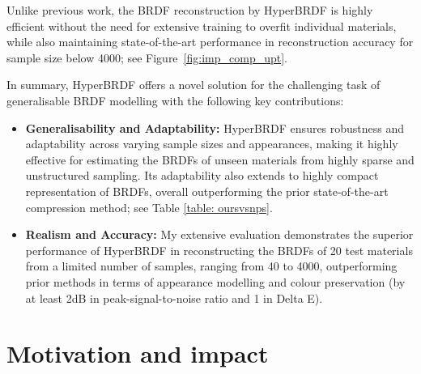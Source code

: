 Unlike previous work, the \gls{BRDF} reconstruction by HyperBRDF is highly efficient without the need for extensive training to overfit individual materials, while also maintaining state-of-the-art performance in reconstruction accuracy for sample size below 4000; see Figure~\ref{fig:imp_comp_upt}.


In summary, HyperBRDF offers a novel solution for the challenging task of generalisable \gls{BRDF} modelling with the following key contributions:
\begin{itemize}
    \item{\textbf{Generalisability and Adaptability:} HyperBRDF ensures robustness and adaptability across varying sample sizes and appearances, making it highly effective for estimating the \gls{BRDF}s of unseen materials from highly sparse and unstructured sampling. Its adaptability also extends to highly compact representation of \gls{BRDF}s, overall outperforming the prior state-of-the-art compression method; see Table \ref{table: oursvsnps}.}
    

    \item{\textbf{Realism and Accuracy:}
    My extensive evaluation demonstrates the superior performance of HyperBRDF in reconstructing the \gls{BRDF}s of 20 test materials from a limited number of samples, ranging from 40 to 4000, outperforming prior methods in terms of appearance modelling and colour preservation (by at least 2dB in peak-signal-to-noise ratio and 1 in Delta E).
    }
\end{itemize}

\section{Motivation and impact}
\label{sec:hyperbrdf-mot}

